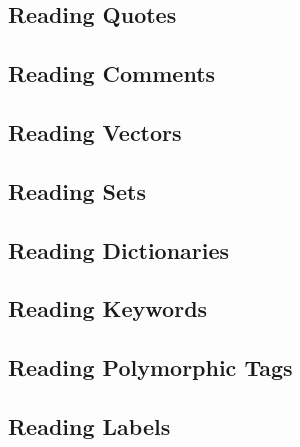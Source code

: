 \subsection{Reading Quotes}
\label{subsec:aml-base-lang-reader-quotes}





\subsection{Reading Comments}
\label{subsec:aml-base-lang-reader-comments}





\subsection{Reading Vectors}
\label{subsec:aml-base-lang-reader-vectors}





\subsection{Reading Sets}
\label{subsec:aml-base-lang-reader-sets}





\subsection{Reading Dictionaries}
\label{subsec:aml-base-lang-reader-dictionaries}





\subsection{Reading Keywords}
\label{subsec:aml-base-lang-reader-keywords}





\subsection{Reading Polymorphic Tags}
\label{subsec:aml-base-lang-reader-polytags}





\subsection{Reading Labels}
\label{subsec:aml-base-lang-reader-labels}





